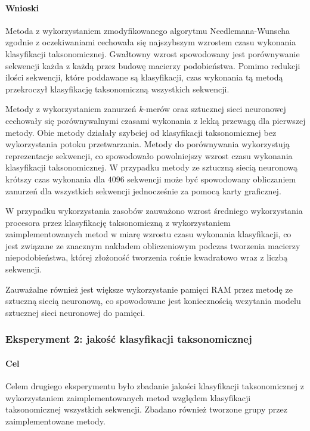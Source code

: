            \paragraph{Wnioski}
                Metoda z wykorzystaniem zmodyfikowanego algorytmu Needlemana-Wunscha zgodnie z oczekiwaniami cechowała się najszybszym wzrostem czasu wykonania klasyfikacji taksonomicznej. Gwałtowny wzrost spowodowany jest porównywanie sekwencji każda z każdą przez budowę macierzy podobieństwa. Pomimo redukcji ilości sekwencji, które poddawane są klasyfikacji, czas wykonania tą metodą przekroczył klasyfikację taksonomiczną wszystkich sekwencji.

                Metody z wykorzystaniem zanurzeń $k$-merów oraz sztucznej sieci neuronowej cechowały się porównywalnymi czasami wykonania z lekką przewagą dla pierwszej metody. Obie metody działały szybciej od klasyfikacji taksonomicznej bez wykorzystania potoku przetwarzania. Metody do porównywania wykorzystują reprezentacje sekwencji, co spowodowało powolniejszy wzrost czasu wykonania klasyfikacji taksonomicznej. W przypadku metody ze sztuczną siecią neuronową krótszy czas wykonania dla $4096$ sekwencji może być spowodowany obliczaniem zanurzeń dla wszystkich sekwencji jednocześnie za pomocą karty graficznej. 

                W przypadku wykorzystania zasobów zauważono wzrost średniego wykorzystania procesora przez klasyfikację taksonomiczną z wykorzystaniem zaimplementowanych metod w miarę wzrostu czasu wykonania klasyfikacji, co jest związane ze znacznym nakładem obliczeniowym podczas tworzenia macierzy niepodobieństwa, której złożoność tworzenia rośnie kwadratowo wraz z liczbą sekwencji.
 
                Zauważalne również jest większe wykorzystanie pamięci RAM przez metodę ze sztuczną siecią neuronową, co spowodowane jest koniecznością wczytania modelu sztucznej sieci neuronowej do pamięci.

        \subsubsection{Eksperyment 2: jakość klasyfikacji taksonomicznej}

            \paragraph{Cel}
                Celem drugiego eksperymentu było zbadanie jakości klasyfikacji taksonomicznej z wykorzystaniem zaimplementowanych metod względem klasyfikacji taksonomicznej wszystkich sekwencji. Zbadano również tworzone grupy przez zaimplementowane metody.

